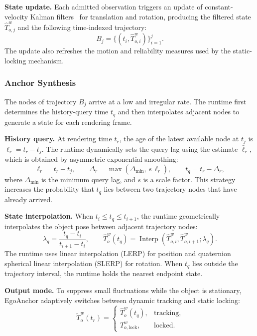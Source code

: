 \documentclass[review]{vgtc}
\begin{document}
\textbf{State update.}
Each admitted observation triggers an update of constant-velocity Kalman filters~\cite{kalman1960new} for translation and rotation, producing the filtered state $\widehat{T}_{o,j}^{w}$ and the following time-indexed trajectory:
\begin{equation}
B_j = \{(t_i, \widehat{T}_{o,i}^{w})\}_{i=1}^{j}.
\label{eq:trajectory}
\end{equation}
The update also refreshes the motion and reliability measures used by the static-locking mechanism.

\subsubsection{Anchor Synthesis}\label{sec:frame-output}

The nodes of trajectory $B_j$ arrive at a low and irregular rate. The runtime first determines the history-query time $t_q$ and then interpolates adjacent nodes to generate a state for each rendering frame.

\textbf{History query.}
At rendering time $t_r$, the age of the latest available node at $t_j$ is $\ell_r=t_r-t_j$. The runtime dynamically sets the query lag using the estimate $\bar{\ell}_r$, which is obtained by asymmetric exponential smoothing:
\begin{equation}
\ell_r = t_r - t_j, \qquad \Delta_r = \max(\Delta_{\min},\, s\,\bar{\ell}_r), \qquad t_q = t_r - \Delta_r,
\label{eq:target-time}
\end{equation}
where $\Delta_{\min}$ is the minimum query lag, and $s$ is a scale factor. This strategy increases the probability that $t_q$ lies between two trajectory nodes that have already arrived.

\textbf{State interpolation.}
When $t_i\leq t_q\leq t_{i+1}$, the runtime geometrically interpolates the object pose between adjacent trajectory nodes:
\begin{equation}
\lambda_q = \frac{t_q - t_i}{t_{i+1} - t_i}, \qquad
\widehat{T}_o^w(t_q) = \operatorname{Interp}(\widehat{T}_{o,i}^{w}, \widehat{T}_{o,i+1}^{w}; \lambda_q).
\label{eq:history-interp}
\end{equation}
The runtime uses linear interpolation (LERP) for position and quaternion spherical linear interpolation (SLERP) for rotation. When $t_q$ lies outside the trajectory interval, the runtime holds the nearest endpoint state.

\textbf{Output mode.}
To suppress small fluctuations while the object is stationary, EgoAnchor adaptively switches between dynamic tracking and static locking:
\begin{equation}
\widetilde{T}_o^w(t_r) = \begin{cases}
\widehat{T}_o^w(t_q), & \text{tracking}, \\
T_{o,\mathrm{lock}}^w, & \text{locked}.
\end{cases}
\label{eq:staticlock}
\end{equation}
\end{document}
